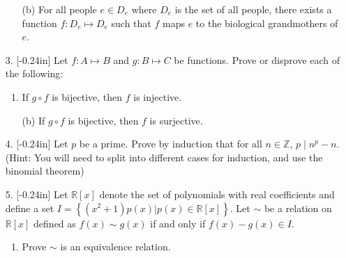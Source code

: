 \documentclass[letterpaper,12pt]{article}
\newcommand{\set}[1]{\left\{ #1 \right\}}
\theoremstyle{definition}
\begin{document}
\pagebreak
\begin{enumerate}
    \item[] \begin{enumerate}
        \item[(b)] For all people $e \in D_e$ where $D_e$ is the set of all people, there exists a function $f:D_e \mapsto D_e$ such that $f$ maps $e$ to the biological grandmothers of $e$.
    \end{enumerate}
\end{enumerate}
\pagebreak
\begin{enumerate}
    \item[3. ]\reversemarginpar{}[-0.24in] Let $f: A \mapsto B$ and $g: B \mapsto C$ be functions. Prove or disprove each of the following: \begin{enumerate}
        \item If $g \circ f$ is bijective, then $f$ is injective.
        
    \end{enumerate}
\end{enumerate}
\pagebreak
\begin{enumerate}
    \item[] \begin{enumerate}
        \item[(b)] If $g \circ f$ is bijective, then $f$ is surjective.
    \end{enumerate}
\end{enumerate}
\pagebreak
\begin{enumerate}
    \item[4.] \reversemarginpar{}[-0.24in] Let $p$ be a prime. Prove by induction that for all $n \in \mathbb{Z}$, $p \mid n^p - n$. (Hint: You will need to split into different cases for induction, and use the binomial theorem)
\end{enumerate}
\pagebreak
\begin{enumerate}
    \item[5.]  \reversemarginpar{}[-0.24in] Let $\mathbb{R}[x]$ denote the set of polynomials with real coefficients and define a set $I = \set{(x^2+1)p(x) | p(x) \in \mathbb{R}[x]}$. Let $\sim$ be a relation on $\mathbb{R}[x]$ defined as $f(x) \sim g(x)$ if and only if $f(x)-g(x) \in I$.
    \begin{enumerate}
        \item Prove $\sim$ is an equivalence relation.
    \end{enumerate}
\end{enumerate}
\end{document}
